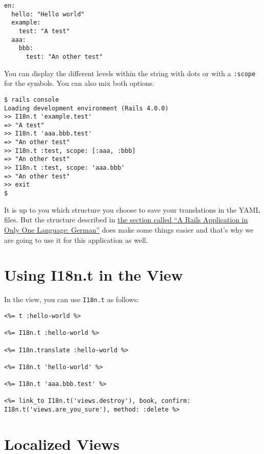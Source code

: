 \documentclass[a4paper]{book}
\begin{document}
\begin{shaded}\begin{verbatim}
en:
  hello: "Hello world"
  example:
    test: "A test"
  aaa:
    bbb:
      test: "An other test"
\end{verbatim}\end{shaded}

You can display the different levels within the string with dots or with a \texttt{:scope} for the symbols. You can also mix both options.

\begin{shaded}\begin{verbatim}
$ rails console
Loading development environment (Rails 4.0.0)
>> I18n.t 'example.test'
=> "A test"
>> I18n.t 'aaa.bbb.test'
=> "An other test"
>> I18n.t :test, scope: [:aaa, :bbb]
=> "An other test"
>> I18n.t :test, scope: 'aaa.bbb'
=> "An other test"
>> exit
$
\end{verbatim}\end{shaded}

It is up to you which structure you choose to save your translations in the YAML files. But the structure described in \hyperref[i18nux5feinsprachigux5fdeutsch]{the section called “A Rails Application in Only One Language: German”} does make some things easier and that's why we are going to use it for this application as well.

\section{Using I18n.t in the View}\label{using-i18n.t-in-the-view}

In the view, you can use \texttt{I18n.t} as follows:

\begin{shaded}\begin{verbatim}
<%= t :hello-world %>

<%= I18n.t :hello-world %>

<%= I18n.translate :hello-world %>

<%= I18n.t 'hello-world' %>

<%= I18n.t 'aaa.bbb.test' %>

<%= link_to I18n.t('views.destroy'), book, confirm: I18n.t('views.are_you_sure'), method: :delete %>
\end{verbatim}\end{shaded}

\section{Localized Views}\label{localized-views}
\end{document}
